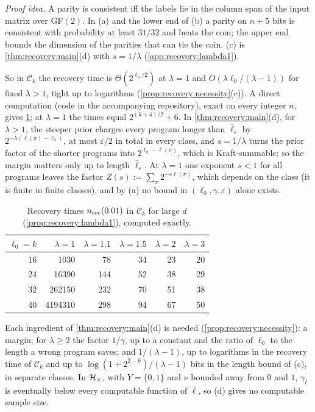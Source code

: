 \emph{Proof idea.} A parity is consistent iff the labels lie in the column span of the input matrix over GF$(2)$. In (a) and the lower end of (b) a parity on $n+5$ bits is consistent with probability at least $31/32$ and beats the coin; the upper end bounds the dimension of the parities that can tie the coin. (c) is \cref{thm:recovery:main}(d) with $s=1/\lambda$ (\cref{app:recovery:lambda1}).

So in $\mathcal C_k$ the recovery time is $\Theta(2^{\ell_0/2})$ at $\lambda=1$ and $O(\lambda\ell_0/(\lambda-1))$ for fixed $\lambda>1$, tight up to logarithms (\cref{prop:recovery:necessity}(c)). A direct computation (code in the accompanying repository), exact on every integer $n$, gives \cref{tab:recovery:times}; at $\lambda=1$ the times equal $2^{(k+4)/2}+6$. In \cref{thm:recovery:main}(d), for $\lambda>1$, the steeper prior charges every program longer than $\bar\ell_\varepsilon$ by $2^{-\lambda(\ell(\pi)-\ell_0)}$, at most $\varepsilon/2$ in total in every class, and $s=1/\lambda$ turns the prior factor of the shorter programs into $2^{\ell_0-\ell(\pi)}$, which is Kraft-summable; so the margin matters only up to length $\bar\ell_\varepsilon$. At $\lambda=1$ one exponent $s<1$ for all programs leaves the factor $Z(s):=\sum_\pi2^{-s\ell(\pi)}$, which depends on the class (it is finite in finite classes), and by (a) no bound in $(\ell_0,\gamma,\varepsilon)$ alone exists.

\begin{table}[ht]\centering\small
\caption{Recovery times $n_{\rm rec}(0.01)$ in $\mathcal C_k$ for large $d$ (\cref{prop:recovery:lambda1}), computed exactly.}\label{tab:recovery:times}
\begin{tabular}{@{}rrrrrr@{}}\toprule
$\ell_0=k$ & $\lambda=1$ & $\lambda=1.1$ & $\lambda=1.5$ & $\lambda=2$ & $\lambda=3$\\\midrule
16 & 1030 & 78 & 34 & 23 & 20\\
24 & 16390 & 144 & 52 & 38 & 29\\
32 & 262150 & 232 & 70 & 51 & 38\\
40 & 4194310 & 298 & 94 & 67 & 50\\\bottomrule
\end{tabular}
\end{table}

Each ingredient of \cref{thm:recovery:main}(d) is needed (\cref{prop:recovery:necessity}): a margin; for $\lambda\ge2$ the factor $1/\gamma$, up to a constant and the ratio of $\ell_0$ to the length a wrong program saves; and $1/(\lambda-1)$, up to logarithms in the recovery time of $\mathcal C_k$ and up to $\log(1+2^{2-k})/(\lambda-1)$ bits in the length bound of (c), in separate classes. In $\mathcal{H}_{\times}$, with $Y=\{0,1\}$ and $\nu$ bounded away from $0$ and $1$, $\gamma_{\bar\ell}$ is eventually below every computable function of $\bar\ell$, so (d) gives no computable sample size.

